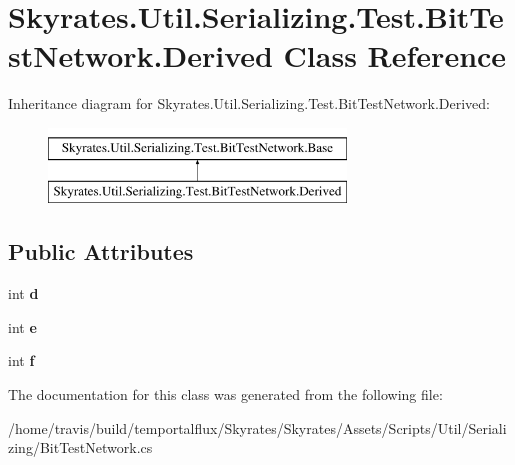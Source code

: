 \hypertarget{class_skyrates_1_1_util_1_1_serializing_1_1_test_1_1_bit_test_network_1_1_derived}{\section{Skyrates.\-Util.\-Serializing.\-Test.\-Bit\-Test\-Network.\-Derived Class Reference}
\label{class_skyrates_1_1_util_1_1_serializing_1_1_test_1_1_bit_test_network_1_1_derived}
}
Inheritance diagram for Skyrates.\-Util.\-Serializing.\-Test.\-Bit\-Test\-Network.\-Derived\-:\begin{figure}[H]
\begin{center}
\leavevmode
\includegraphics[height=2.000000cm]{class_skyrates_1_1_util_1_1_serializing_1_1_test_1_1_bit_test_network_1_1_derived}
\end{center}
\end{figure}
\subsection*{Public Attributes}
\begin{DoxyCompactItemize}
\item 
\hypertarget{class_skyrates_1_1_util_1_1_serializing_1_1_test_1_1_bit_test_network_1_1_derived_a368e84935415f807102e9a79e2429006}{int {\bfseries d}}\label{class_skyrates_1_1_util_1_1_serializing_1_1_test_1_1_bit_test_network_1_1_derived_a368e84935415f807102e9a79e2429006}

\item 
\hypertarget{class_skyrates_1_1_util_1_1_serializing_1_1_test_1_1_bit_test_network_1_1_derived_a4ed6de8e27782e660375682bde015662}{int {\bfseries e}}\label{class_skyrates_1_1_util_1_1_serializing_1_1_test_1_1_bit_test_network_1_1_derived_a4ed6de8e27782e660375682bde015662}

\item 
\hypertarget{class_skyrates_1_1_util_1_1_serializing_1_1_test_1_1_bit_test_network_1_1_derived_a14fe5c0f2f68f4d3b0742842c9c17375}{int {\bfseries f}}\label{class_skyrates_1_1_util_1_1_serializing_1_1_test_1_1_bit_test_network_1_1_derived_a14fe5c0f2f68f4d3b0742842c9c17375}

\end{DoxyCompactItemize}


The documentation for this class was generated from the following file\-:\begin{DoxyCompactItemize}
\item 
/home/travis/build/temportalflux/\-Skyrates/\-Skyrates/\-Assets/\-Scripts/\-Util/\-Serializing/Bit\-Test\-Network.\-cs\end{DoxyCompactItemize}
